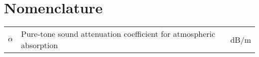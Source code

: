 \newpage\chapter*{Nomenclature}

\begin{longtable}[l]{p{50pt} p{300pt} p{50pt}}
$\alpha$    &   Pure-tone sound attenuation coefficient for atmospheric absorption  &   dB/m \\


\end{longtable}
